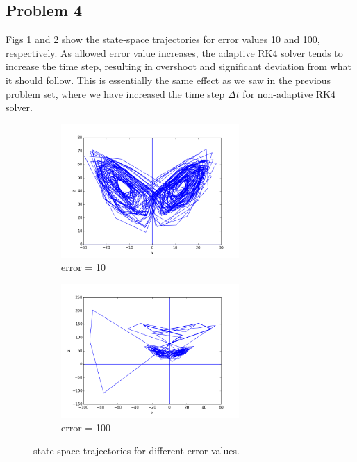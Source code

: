 \documentclass{article}
\begin{document}
\subsection*{Problem 4}
Figs \ref{q4_1} and \ref{q4_2} show the state-space trajectories for error values 10 and 100, respectively. As allowed error value increases, the adaptive RK4 solver tends to increase the time step, resulting in overshoot and significant deviation from what it should follow. This is essentially the same effect as we saw in the previous problem set, where we have increased the time step $\Delta t$ for non-adaptive RK4 solver.
\begin{figure}
\centering
\begin{subfigure}{.5\textwidth}
  \centering
  \includegraphics[height=2in]{figs/q4/err_10.png}
  \caption{error = 10}
  \label{q4_1}
\end{subfigure}%
\begin{subfigure}{.5\textwidth}
  \centering
  \includegraphics[height=2in]{figs/q4/err_100.png}
  \caption{error = 100}
  \label{q4_2}
\end{subfigure}
\caption{state-space trajectories for different error values.}
\label{q4}
\end{figure}
\end{document}

